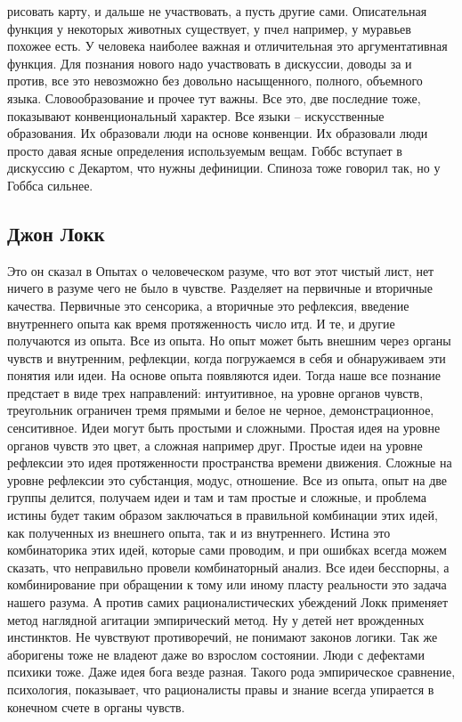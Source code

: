 \documentclass[a4paper, 12pt]{article}
\begin{document}
рисовать карту, и дальше не участвовать, а пусть другие сами. 
Описательная функция у некоторых животных существует, у пчел например, 
у муравьев похожее есть. У человека наиболее важная и отличительная это 
аргументативная функция. Для познания нового надо участвовать 
в дискуссии, доводы за и против, все это невозможно без довольно 
насыщенного, полного, объемного языка. Словообразование и прочее тут 
важны. Все это, две последние тоже, показывают конвенциональный 
характер. Все языки -- искусственные образования. Их образовали люди на 
основе конвенции. Их образовали люди просто давая ясные определения 
используемым вещам. Гоббс вступает в дискуссию с Декартом, что нужны 
дефиниции. Спиноза тоже говорил так, но у Гоббса сильнее.


\subsection{Джон Локк}

Это он сказал в Опытах о человеческом разуме, что вот этот чистый лист, 
нет ничего в разуме чего не было в чувстве. Разделяет на первичные 
и вторичные качества. Первичные это сенсорика, а вторичные это 
рефлексия, введение внутреннего опыта как время протяженность число итд. 
И те, и другие получаются из опыта. Все из опыта. Но опыт может быть 
внешним через органы чувств и внутренним, рефлекции, когда погружаемся 
в себя и обнаруживаем эти понятия или идеи. На основе опыта появляются 
идеи. Тогда наше все познание предстает в виде трех направлений: 
интуитивное, на уровне органов чувств, треугольник ограничен тремя 
прямыми и белое не черное, демонстрационное, сенситивное. Идеи могут 
быть простыми и сложными. Простая идея на уровне органов чувств это 
цвет, а сложная например друг. Простые идеи на уровне рефлексии это идея 
протяженности пространства времени движения. Сложные на уровне рефлексии 
это субстанция, модус, отношение. Все из опыта, опыт на две группы 
делится, получаем идеи и там и там простые и сложные, и проблема истины 
будет таким образом заключаться в правильной комбинации этих идей, как 
полученных из внешнего опыта, так и из внутреннего. Истина это 
комбинаторика этих идей, которые сами проводим, и при ошибках всегда 
можем сказать, что неправильно провели комбинаторный анализ. Все идеи 
бесспорны, а комбинирование при обращении к тому или иному пласту 
реальности это задача нашего разума. А против самих рационалистических 
убеждений Локк применяет метод наглядной агитации эмпирический метод. Ну 
у детей нет врожденных инстинктов. Не чувствуют противоречий, не 
понимают законов логики. Так же аборигены тоже не владеют даже во 
взрослом состоянии. Люди с дефектами психики тоже. Даже идея бога везде 
разная. Такого рода эмпирическое сравнение, психология, показывает, что 
рационалисты правы и знание всегда упирается в конечном счете в органы 
чувств.
\end{document}
